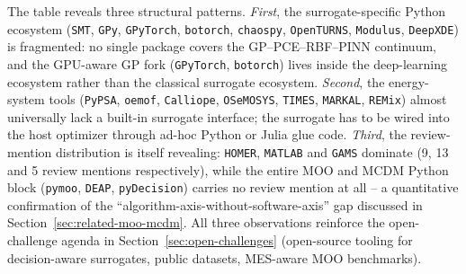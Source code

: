 The table reveals three structural patterns. \emph{First}, the
surrogate-specific Python ecosystem (\texttt{SMT}, \texttt{GPy},
\texttt{GPyTorch}, \texttt{botorch}, \texttt{chaospy},
\texttt{OpenTURNS}, \texttt{Modulus}, \texttt{DeepXDE}) is
fragmented: no single package covers the GP--PCE--RBF--PINN
continuum, and the GPU-aware GP fork (\texttt{GPyTorch},
\texttt{botorch}) lives inside the deep-learning ecosystem rather
than the classical surrogate ecosystem. \emph{Second}, the energy-
system tools (\texttt{PyPSA}, \texttt{oemof}, \texttt{Calliope},
\texttt{OSeMOSYS}, \texttt{TIMES}, \texttt{MARKAL}, \texttt{REMix})
almost universally lack a built-in surrogate interface; the
surrogate has to be wired into the host optimizer through ad-hoc
Python or Julia glue code. \emph{Third}, the review-mention
distribution is itself revealing: \texttt{HOMER}, \texttt{MATLAB}
and \texttt{GAMS} dominate (9, 13 and 5 review mentions
respectively), while the entire MOO and MCDM Python block
(\texttt{pymoo}, \texttt{DEAP}, \texttt{pyDecision}) carries no
review mention at all -- a quantitative confirmation of the
``algorithm-axis-without-software-axis'' gap discussed in
Section~\ref{sec:related-moo-mcdm}. All three observations
reinforce the open-challenge agenda in
Section~\ref{sec:open-challenges} (open-source tooling for
decision-aware surrogates, public datasets, MES-aware MOO
benchmarks).

